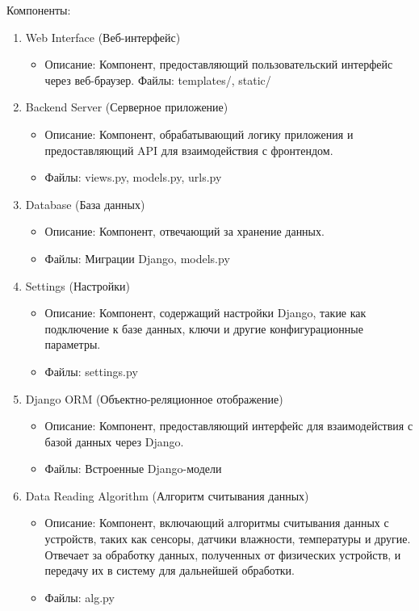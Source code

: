 Компоненты:
\begin{enumerate}
	
\item Web Interface (Веб-интерфейс)

\begin{itemize}
\item Описание: Компонент, предоставляющий пользовательский интерфейс через веб-браузер.
Файлы: templates/, static/
\end{itemize}

\item Backend Server (Серверное приложение)
\begin{itemize}
\item Описание: Компонент, обрабатывающий логику приложения и предоставляющий API для взаимодействия с фронтендом.
\item Файлы: views.py, models.py, urls.py
\end{itemize}

\item Database (База данных)
\begin{itemize}
\item Описание: Компонент, отвечающий за хранение данных.
\item Файлы: Миграции Django, models.py
\end{itemize}

\item Settings (Настройки)
\begin{itemize}
\item Описание: Компонент, содержащий настройки Django, такие как подключение к базе данных, ключи и другие конфигурационные параметры.
\item Файлы: settings.py
\end{itemize}

\item Django ORM (Объектно-реляционное отображение)
\begin{itemize}
\item Описание: Компонент, предоставляющий интерфейс для взаимодействия с базой данных через Django.
\item Файлы: Встроенные Django-модели
\end{itemize}

\item Data Reading Algorithm (Алгоритм считывания данных)
\begin{itemize}
\item Описание: Компонент, включающий алгоритмы считывания данных с устройств, таких как сенсоры, датчики влажности, температуры и другие. Отвечает за обработку данных, полученных от физических устройств, и передачу их в систему для дальнейшей обработки.
\item Файлы: {alg.py}
\end{itemize}



\end{enumerate}







